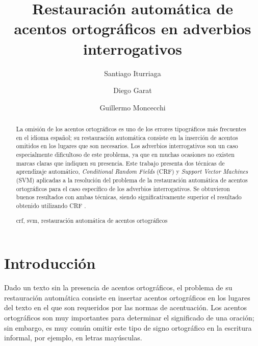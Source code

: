 \documentclass[runningheads,a4paper]{llncs}
\newcommand{\keywords}[1]{\par\addvspace\baselineskip
\noindent\keywordname\enspace\ignorespaces#1}
\begin{document}
\mainmatter  %

\title{Restauración automática de acentos ortográficos en adverbios interrogativos}


\author{Santiago Iturriaga \and Diego Garat \and Guillermo Moncecchi} 

%


\maketitle

\begin{abstract}
La omisión de los acentos ortográficos es uno de los errores tipográficos más frecuentes en el idioma español; su restauración automática consiste en la inserción de acentos  omitidos en los lugares que son necesarios. Los adverbios interrogativos son un caso especialmente dificultoso de este problema, ya que en muchas ocasiones no existen marcas claras que indiquen su presencia. Este trabajo presenta dos técnicas de aprendizaje automático, \emph{Conditional Random Fields} (CRF) y \emph{Support Vector Machines} (SVM) aplicadas a la resolución del problema de la restauración automática de acentos ortográficos para el caso específico de los adverbios interrogativos. Se obtuvieron buenos resultados con ambas t\'ecnicas, siendo significativamente superior el resultado obtenido utilizando CRF .
\keywords{crf, svm, restauración automática de acentos ortográficos}
\end{abstract}

\section{Introducción}
Dado un texto sin la presencia de acentos ortográficos, el problema de su  restauración automática consiste en insertar acentos ortográficos en los lugares del texto en el que son requeridos por las normas de acentuación. Los acentos ortográficos son muy importantes para determinar el significado de una oración; sin embargo, es muy común omitir este tipo de signo ortográfico en la escritura informal, por ejemplo, en letras mayúsculas.
\end{document}

